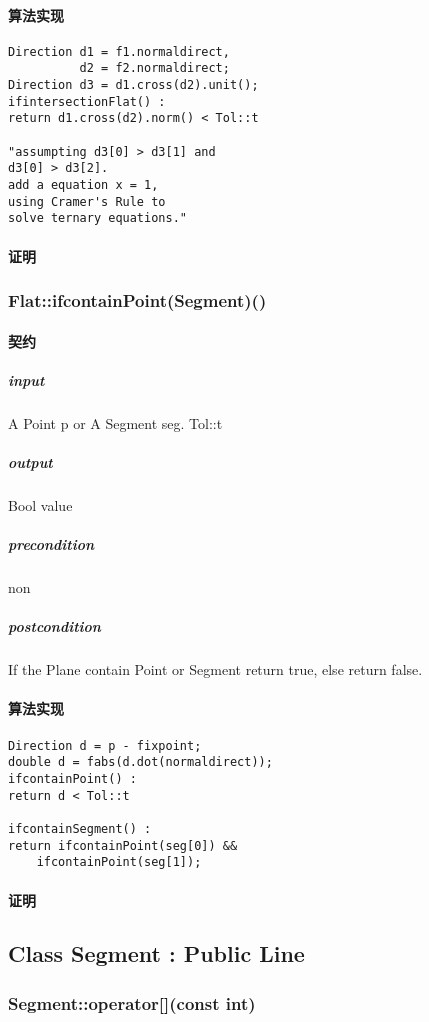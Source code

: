\documentclass[a4paper]{book}
\numberwithin{equation}{chapter}
\theoremstyle{definition}
\begin{document}
\begin{multicols}{2}
\paragraph{算法实现}
\begin{lstlisting}
Direction d1 = f1.normaldirect,
		  d2 = f2.normaldirect;
Direction d3 = d1.cross(d2).unit(); 
ifintersectionFlat() :
return d1.cross(d2).norm() < Tol::t

"assumpting d3[0] > d3[1] and 
d3[0] > d3[2].
add a equation x = 1,
using Cramer's Rule to 
solve ternary equations."

\end{lstlisting}
\paragraph{证明}

\subsubsection{Flat::ifcontainPoint(Segment)()}
\paragraph{契约}
\subparagraph{input}
A Point p or A Segment seg. Tol::t
\subparagraph{output}
Bool value
\subparagraph{precondition}
non
\subparagraph{postcondition}
If the Plane contain Point or Segment return true, else return false.
\paragraph{算法实现}
\begin{lstlisting}
Direction d = p - fixpoint;
double d = fabs(d.dot(normaldirect));
ifcontainPoint() :
return d < Tol::t

ifcontainSegment() : 
return ifcontainPoint(seg[0]) && 
	ifcontainPoint(seg[1]);
\end{lstlisting}
\paragraph{证明}


\subsection{Class Segment : Public Line }

\subsubsection{Segment::operator[](const int)}

\end{multicols}
\end{document}
